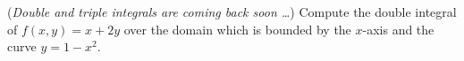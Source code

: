 (\emph{Double and triple integrals are coming back soon \dots})  Compute the double integral of $f(x,y) = x+2y$ over the domain which is bounded by the $x$-axis and the curve $y=1-x^2$.
